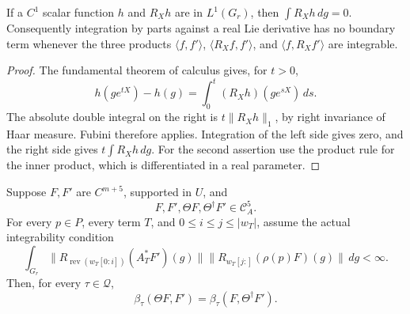 \begin{lemma}\label{jp-ibp}
If a \(C^1\) scalar function \(h\) and \(R_Xh\) are in
\(L^1(G_r)\), then \(\int R_Xh\,dg=0\).
Consequently integration by parts against a real Lie
derivative has no boundary term whenever the three products
\(\langle f,f'\rangle\),
\(\langle R_Xf,f'\rangle\), and
\(\langle f,R_Xf'\rangle\) are integrable.
\end{lemma}

\begin{proof}
The fundamental theorem of calculus gives, for \(t>0\),
\[
       h(ge^{tX})-h(g)=\int_0^t(R_Xh)(ge^{sX})\,ds.
\]
The absolute double integral on the right is
\(t\|R_Xh\|_1\), by right invariance of Haar measure.
Fubini therefore applies.  Integration of the left side
gives zero, and the right side gives \(t\int R_Xh\,dg\).
For the second assertion use the product rule for the
inner product, which is differentiated in a real parameter.
\end{proof}

\begin{theorem}\label{jp-adjoint}
Suppose \(F,F'\) are \(C^{m+5}\), supported in \(U\), and
\[
       F,F',\Theta F,\Theta^\dagger F'\in\mathcal C_A^5 .
\]
For every \(p\in P\), every term \(T\), and
\(0\leq i\leq j\leq|w_T|\), assume the actual integrability
condition
\begin{equation}\label{jp-intclause}
 \int_{G_r}
   \bigl\|R_{\operatorname{rev}(w_T[0:i])}(A_T^*F')(g)\bigr\|
   \bigl\|R_{w_T[j:]}(\rho(p)F)(g)\bigr\|\,dg<\infty .
\end{equation}
Then, for every \(\tau\in\mathcal Q\),
\begin{equation}\label{jp-adjoint-identity}
            \beta_\tau(\Theta F,F')
                         =\beta_\tau(F,\Theta^\dagger F').
\end{equation}
\end{theorem}

